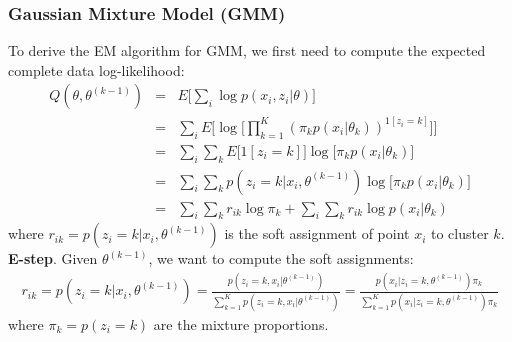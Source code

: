 \subsubsection{Gaussian Mixture Model (GMM)}

To derive the EM algorithm for GMM, we first need to compute the expected complete data log-likelihood:
\begin{eqnarray}
    Q(\theta, \theta^{(k-1)}) &=& E\bigg[\sum_i \log p(x_i, z_i|\theta) \bigg] \nonumber \\
    &=& \sum_i E\bigg[ \log \bigg[\prod_{k=1}^{K}(\pi_k p(x_i|\theta_k))^{1[z_i=k]}\bigg]\bigg] \\
    &=& \sum_i \sum_k E\big[1[z_i = k]\big] \log \big[\pi_k p(x_i|\theta_k) \big] \\
    &=& \sum_i \sum_k p(z_i = k|x_i,\theta^{(k-1)}) \log \big[\pi_k p(x_i|\theta_k) \big] \\
    &=& \sum_i \sum_k r_{ik} \log \pi_k + \sum_i \sum_k r_{ik} \log p(x_i|\theta_k)
\end{eqnarray}
where $r_{ik} = p(z_i = k | x_i, \theta^{(k-1)})$ is the soft assignment of point $x_i$ to cluster $k$.\\

\textbf{E-step}. Given $\theta^{(k-1)}$, we want to compute the soft assignments:
\begin{eqnarray}
    r_{ik} = p(z_i=k|x_i, \theta^{(k-1)}) = \frac{p(z_i=k,x_i|\theta^{(k-1)})}{\sum_{k=1}^{K}p(z_i=k,x_i|\theta^{(k-1)})} = \frac{p(x_i|z_i=k, \theta^{(k-1)})\pi_k}{\sum_{k=1}^{K}p(x_i|z_i=k, \theta^{(k-1)})\pi_k}
\end{eqnarray}
where $\pi_k = p(z_i = k)$ are the mixture proportions.\\

